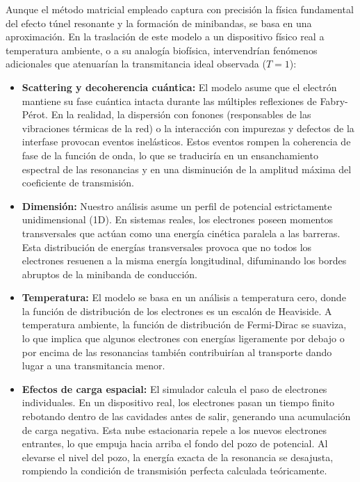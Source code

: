 \documentclass[a4paper,12pt]{article}
\begin{document}
Aunque el método matricial empleado captura con precisión la física fundamental del efecto túnel resonante y la formación de minibandas, se basa en una aproximación. En la traslación de este modelo a un dispositivo físico real a temperatura ambiente, o a su analogía biofísica, intervendrían fenómenos adicionales que atenuarían la transmitancia ideal observada ($T=1$):
\begin{itemize}
    \item \textbf{Scattering y decoherencia cuántica:} El modelo asume que el electrón mantiene su fase cuántica intacta durante las múltiples reflexiones de Fabry-Pérot. En la realidad, la dispersión con fonones (responsables de las vibraciones térmicas de la red) o la interacción con impurezas y defectos de la interfase provocan eventos inelásticos. Estos eventos rompen la coherencia de fase de la función de onda, lo que se traduciría en un ensanchamiento espectral de las resonancias y en una disminución de la amplitud máxima del coeficiente de transmisión.
    \item \textbf{Dimensión:} Nuestro análisis asume un perfil de potencial estrictamente unidimensional (1D). En sistemas reales, los electrones poseen momentos transversales que actúan como una energía cinética paralela a las barreras. Esta distribución de energías transversales provoca que no todos los electrones resuenen a la misma energía longitudinal, difuminando los bordes abruptos de la minibanda de conducción.
    \item \textbf{Temperatura:} El modelo se basa en un análisis a temperatura cero, donde la función de distribución de los electrones es un escalón de Heaviside. A temperatura ambiente, la función de distribución de Fermi-Dirac se suaviza, lo que implica que algunos electrones con energías ligeramente por debajo o por encima de las resonancias también contribuirían al transporte dando lugar a una transmitancia menor.
    \item \textbf{Efectos de carga espacial:} El simulador calcula el paso de electrones individuales. En un dispositivo real, los electrones pasan un tiempo finito rebotando dentro de las cavidades antes de salir, generando una acumulación de carga negativa. Esta nube estacionaria repele a los nuevos electrones entrantes, lo que empuja hacia arriba el fondo del pozo de potencial. Al elevarse el nivel del pozo, la energía exacta de la resonancia se desajusta, rompiendo la condición de transmisión perfecta calculada teóricamente. 
\end{itemize}
\end{document}
